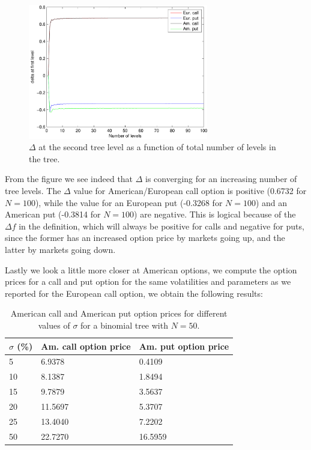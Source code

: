 \documentclass[11pt,a4paper]{article}
\begin{document}
\begin{figure}[H]
  \centering
  \includegraphics[width=0.7\textwidth]{delta.pdf}
  \caption{$\Delta$ at the second tree level as a function of total number of levels in the tree.}
  \label{fig:delta}
\end{figure}

From the figure we see indeed that $\Delta$ is converging for an increasing number of tree levels. The $\Delta$ value for American/European call option is positive (0.6732 for $N = 100$), while the value for an European put (-0.3268 for $N = 100$) and an American put (-0.3814 for $N = 100$) are negative. This is logical because of the $\Delta f$ in the definition, which will always be positive for calls and negative for puts, since the former has an increased option price by markets going up, and the latter by markets going down.

Lastly we look a little more closer at American options, we compute the option prices for a call and put option for the same volatilities and parameters as we reported for the European call option, we obtain the following results:

\begin{table}[H]
  \centering
  \begin{tabular}{l | l | l}
    $\sigma$ (\%) & Am. call option price & Am. put option price \\
    \hline
    5 & 6.9378 & 0.4109\\
    10 & 8.1387 & 1.8494\\
    15 & 9.7879 & 3.5637\\
    20 & 11.5697 & 5.3707\\
    25 & 13.4040 & 7.2202\\
    50 & 22.7270 & 16.5959\\
  \end{tabular}
  \caption{American call and American put option prices for different values of $\sigma$ for a binomial tree with $N = 50$.}
  \label{tab:amcall}
\end{table}
\end{document}
